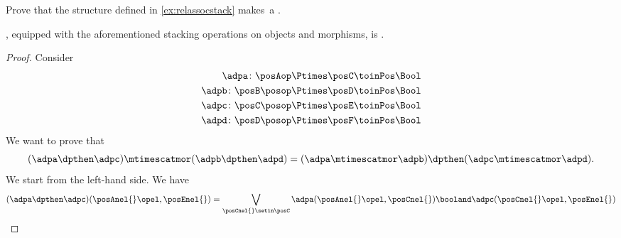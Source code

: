{\begin{gradedexercise}
    \label{ex:RelFunStack}
    Prove that the structure defined in \cref{ex:relassocstack} makes~\RelL a .
\end{gradedexercise}


\begin{lemma}\label{lem:DPL-functorial-stacking}
    \DPL, equipped with the aforementioned stacking operations on objects and morphisms, is .
\end{lemma}

\begin{proof}
    Consider
    \begin{equation}
        \begin{aligned}
            \adpa\colon \posAop\Ptimes \posC     & \toinPos \Bool \\
            \adpb\colon \posB\posop\Ptimes \posD & \toinPos \Bool \\
            \adpc\colon \posC\posop\Ptimes \posE & \toinPos \Bool \\
            \adpd\colon \posD\posop\Ptimes \posF & \toinPos \Bool
        \end{aligned}
    \end{equation}
    We want to prove that
    \begin{equation}
        (\adpa \dpthen \adpc)
        \mtimescatmor (\adpb \dpthen \adpd)=(\adpa \mtimescatmor \adpb) \dpthen (\adpc \mtimescatmor \adpd).
    \end{equation}
    We start from the left-hand side.
    We have
    \begin{equation}
        (\adpa \dpthen \adpc)(\posAnel{}\opel,\posEnel{})
        =\bigvee_{\posCnel{}\setin \posC}
        \adpa(\posAnel{}\opel, \posCnel{}) \booland \adpc(\posCnel{}\opel,\posEnel{})

\end{equation}
\end{proof}}
